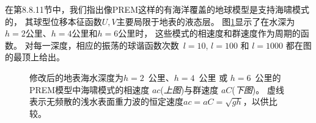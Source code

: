在第8.8.11节中，我们指出像PREM这样的有海洋覆盖的地球模型是支持海啸模式的，
其球型位移本征函数$U,V$主要局限于地表的液态层。
图\ref{fig:11.7}显示了在水深为$h=2$公里、$h=4$公里和$h=6$公里时，
这些模式的相速度和群速度作为周期的函数。
对每一深度，相应的振荡的球谐函数次数~$l=10$, $l=100$ 和 $l=1000$ 都在图的最顶上给出。
\begin{figure}
\begin{center}
\end{center}
\caption[tsunami speeds]{
\label{fig:11.7}
修改后的地表海水深度为$h=2$~公里、$h=4$~公里 或 $h=6$~公里的PREM模型中海啸模式的相速度 $ac$({\em 上图\/})与群速度 $aC$({\em 下图\/})。
虚线表示无频散的浅水表面重力波的恒定速度$ac=aC=\sqrt{gh}$，以供比较。}
\end{figure}
